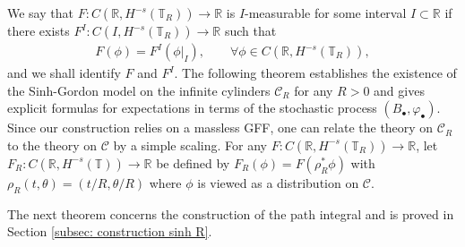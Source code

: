 \documentclass[11pt]{amsart}
\numberwithin{equation}{section}
\theoremstyle{definition}
\newcommand{\R}{\mathbb{R}}
\newcommand{\mc}{\mathcal}
\def\T{\mathbb{T}}
\begin{document}
We say that $F:C(\mathbb{R}, H^{-s}(\T_R)) \rightarrow \mathbb{R}$ is $I$-measurable for some interval $I\subset \R$ if there exists 
$F^I : C(I, H^{-s}(\T_R)) \rightarrow \mathbb{R}$ such that
\begin{align*}
F(\phi) 
= 
F^I(\phi|_I), \qquad \forall 	\phi \in C(\mathbb{R}, H^{-s}(\T_R)),
\end{align*} 
and we shall identify $F$ and $F^I$.
The following theorem establishes the existence of the Sinh-Gordon model on the infinite cylinders $\mc{C}_R$ for any $R>0$ and gives explicit formulas for expectations in terms of the stochastic process $(B_\bullet,\varphi_\bullet)$. Since our construction relies on a massless GFF, one can relate the theory on $\mc{C}_R$ to the theory on $\mc{C}$ by a simple scaling. For any $F:C(\mathbb{R}, H^{-s}(\T_R))\rightarrow \mathbb{R}$, let $F_R:C(\mathbb{R}, H^{-s}(\T)) \rightarrow \mathbb{R}$ be defined by $F_R(\phi)=F(\rho_R^*\phi)$ with $\rho_R(t,\theta)=(t/R,\theta/R)$ where $\phi$ is viewed as a distribution on $\mc{C}$. 


The next theorem concerns the construction of the path integral and is proved in Section \ref{subsec: construction sinh R}.
\end{document}
